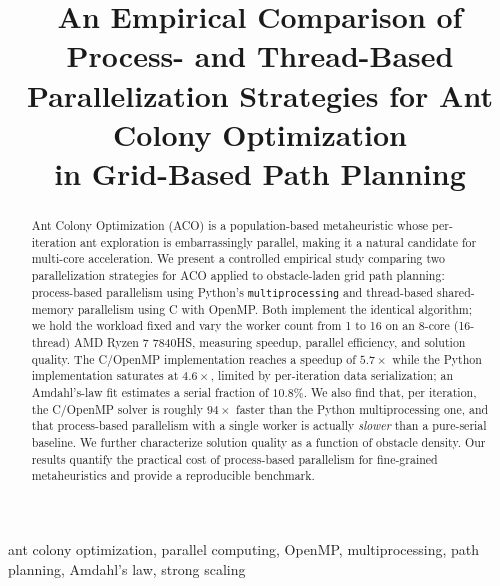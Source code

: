 \documentclass[conference]{IEEEtran}
\begin{document}
\title{An Empirical Comparison of Process- and Thread-Based\\
Parallelization Strategies for Ant Colony Optimization\\
in Grid-Based Path Planning}

\author{
}

\maketitle

\begin{abstract}
Ant Colony Optimization (ACO) is a population-based metaheuristic whose
per-iteration ant exploration is embarrassingly parallel, making it a natural
candidate for multi-core acceleration. We present a controlled empirical study
comparing two parallelization strategies for ACO applied to obstacle-laden grid
path planning: process-based parallelism using Python's \texttt{multiprocessing}
and thread-based shared-memory parallelism using C with OpenMP. Both implement
the identical algorithm; we hold the workload fixed and vary the worker count
from 1 to 16 on an 8-core (16-thread) AMD Ryzen 7 7840HS, measuring speedup,
parallel efficiency, and solution quality. The C/OpenMP implementation reaches a
speedup of $5.7\times$ while the Python implementation saturates at $4.6\times$,
limited by per-iteration data serialization; an Amdahl's-law fit estimates a
serial fraction of $10.8\%$. We also find that, per iteration, the C/OpenMP
solver is roughly $94\times$ faster than the Python multiprocessing one, and that
process-based parallelism with a single worker is actually \emph{slower} than a
pure-serial baseline. We further characterize solution quality as a function of
obstacle density. Our results quantify the practical cost of process-based
parallelism for fine-grained metaheuristics and provide a reproducible benchmark.
\end{abstract}

\begin{IEEEkeywords}
ant colony optimization, parallel computing, OpenMP, multiprocessing,
path planning, Amdahl's law, strong scaling
\end{IEEEkeywords}

\end{document}
